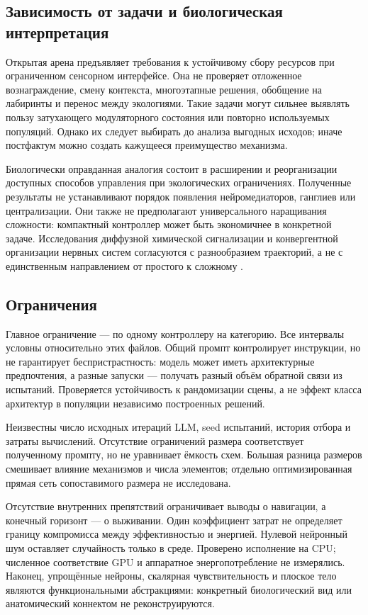 \documentclass[11pt]{article}
\begin{document}
\subsection{Зависимость от задачи и биологическая интерпретация}
Открытая арена предъявляет требования к устойчивому сбору ресурсов при ограниченном сенсорном интерфейсе. Она не проверяет отложенное вознаграждение, смену контекста, многоэтапные решения, обобщение на лабиринты и перенос между экологиями. Такие задачи могут сильнее выявлять пользу затухающего модуляторного состояния или повторно используемых популяций. Однако их следует выбирать до анализа выгодных исходов; иначе постфактум можно создать кажущееся преимущество механизма.

Биологически оправданная аналогия состоит в расширении и реорганизации доступных способов управления при экологических ограничениях. Полученные результаты не устанавливают порядок появления нейромедиаторов, ганглиев или централизации. Они также не предполагают универсального наращивания сложности: компактный контроллер может быть экономичнее в конкретной задаче. Исследования диффузной химической сигнализации и конвергентной организации нервных систем согласуются с разнообразием траекторий, а не с единственным направлением от простого к сложному \citep{jekely2021,martin2018}.

\subsection{Ограничения}
Главное ограничение --- по одному контроллеру на категорию. Все интервалы условны относительно этих файлов. Общий промпт контролирует инструкции, но не гарантирует беспристрастность: модель может иметь архитектурные предпочтения, а разные запуски --- получать разный объём обратной связи из испытаний. Проверяется устойчивость к рандомизации сцены, а не эффект класса архитектур в популяции независимо построенных решений.

Неизвестны число исходных итераций LLM, seed испытаний, история отбора и затраты вычислений. Отсутствие ограничений размера соответствует полученному промпту, но не уравнивает ёмкость схем. Большая разница размеров смешивает влияние механизмов и числа элементов; отдельно оптимизированная прямая сеть сопоставимого размера не исследована.

Отсутствие внутренних препятствий ограничивает выводы о навигации, а конечный горизонт --- о выживании. Один коэффициент затрат не определяет границу компромисса между эффективностью и энергией. Нулевой нейронный шум оставляет случайность только в среде. Проверено исполнение на CPU; численное соответствие GPU и аппаратное энергопотребление не измерялись. Наконец, упрощённые нейроны, скалярная чувствительность и плоское тело являются функциональными абстракциями: конкретный биологический вид или анатомический коннектом не реконструируются.
\end{document}
